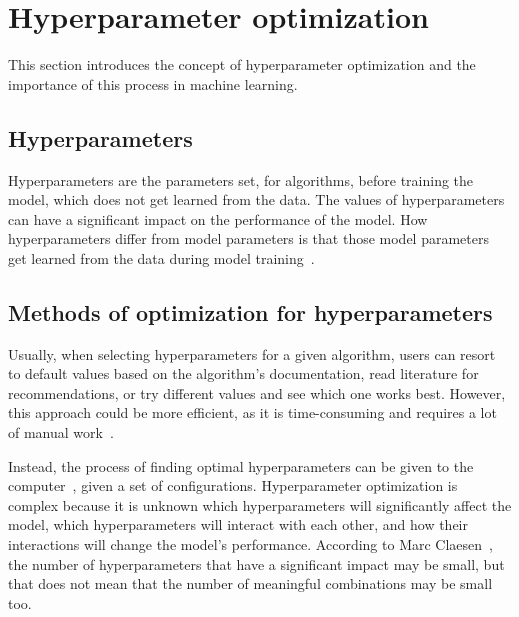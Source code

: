 \section{Hyperparameter optimization}\label{sec:hyperparam}
This section introduces the concept of hyperparameter optimization and the importance of this process in machine learning.


\subsection{Hyperparameters}\label{subsec:hyperparam-what}
Hyperparameters are the parameters set, for algorithms, before training the model, which does not get learned from the data. The values of hyperparameters can have a significant impact on the performance of the model. How hyperparameters differ from model parameters is that those model parameters get learned from the data during model training~\cite{probst2019tunability}.

\subsection{Methods of optimization for hyperparameters}\label{subsec:hyperparam-how}
Usually, when selecting hyperparameters for a given algorithm, users can resort to default values based on the algorithm's documentation, read literature for recommendations, or try different values and see which one works best. However, this approach could be more efficient, as it is time-consuming and requires a lot of manual work~\cite{probst2019tunability}.

Instead, the process of finding optimal hyperparameters can be given to the computer~\cite{automated-machine-learning}, given a set of configurations. Hyperparameter optimization is complex because it is unknown which hyperparameters will significantly affect the model, which hyperparameters will interact with each other, and how their interactions will change the model's performance. According to Marc Claesen~\cite{hyperparam-search}, the number of hyperparameters that have a significant impact may be small, but that does not mean that the number of meaningful combinations may be small too.

